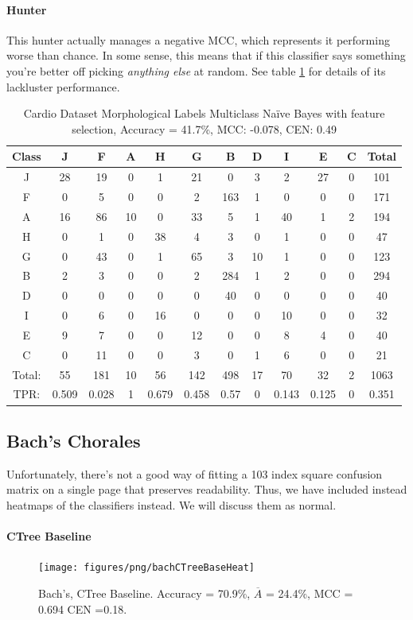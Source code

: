 \paragraph{Hunter}
This hunter actually manages a negative MCC, which represents it performing worse than chance. In some sense, this means that if this classifier says something you're better off picking \textit{anything else} at random.  See table \ref{tab:cardiomorphhunter} for details of its lackluster performance.  
\begin{table}[h!]
	\centering
	\begin{tabular}{|c|c|c|c|c|c|c|c|c|c|c|c|}
		\hline
		Class&J&F&A&H&G&B&D&I&E&C&Total\\\hline
		J&28&19&0&1&21&0&3&2&27&0&101\\
		F&0&5&0&0&2&163&1&0&0&0&171\\
		A&16&86&10&0&33&5&1&40&1&2&194\\
		H&0&1&0&38&4&3&0&1&0&0&47\\
		G&0&43&0&1&65&3&10&1&0&0&123\\
		B&2&3&0&0&2&284&1&2&0&0&294\\
		D&0&0&0&0&0&40&0&0&0&0&40\\
		I&0&6&0&16&0&0&0&10&0&0&32\\
		E&9&7&0&0&12&0&0&8&4&0&40\\
		C&0&11&0&0&3&0&1&6&0&0&21\\\hline
		Total:&55&181&10&56&142&498&17&70&32&2&1063\\
		TPR:&0.509&0.028&1&0.679&0.458&0.57&0&0.143&0.125&0&0.351\\
		\hline
	\end{tabular}
	\caption[Cardiotocography Morphology: Hunter Confusion Matrix]{Cardio Dataset Morphological Labels Multiclass Na\"ive Bayes with feature selection, Accuracy = 41.7\%, MCC: -0.078, CEN: 0.49}
	\label{tab:cardiomorphhunter}
\end{table}


\subsection{Bach's Chorales}
Unfortunately, there's not a good way of fitting a 103 index square confusion matrix on a single page that preserves readability.  Thus, we have included instead heatmaps of the classifiers instead.  We will discuss them as normal.


\paragraph{CTree Baseline}
\begin{figure}
	\centering
	\texttt{[image: figures/png/bachCTreeBaseHeat]}
	\caption[Bach's Chorales Classification Tree Without Feature Selection]{Bach's, CTree Baseline. Accuracy = 70.9\%, $\overline{A}$ = 24.4\%, MCC = 0.694 CEN =0.18.  }
	\label{fig:bachctreebaseheat}
\end{figure}

